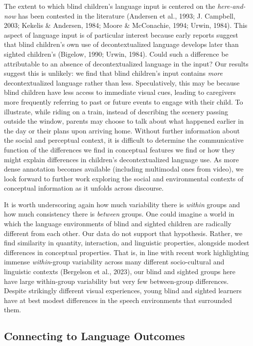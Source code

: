 \documentclass[
  man]{apa6}
\begin{document}
The extent to which blind children's language input is centered on the \emph{here-and-now} has been contested in the literature (Andersen et al., 1993; J. Campbell, 2003; Kekelis \& Andersen, 1984; Moore \& McConachie, 1994; Urwin, 1984). This aspect of language input is of particular interest because early reports suggest that blind children's own use of decontextualized language develops later than sighted children's (Bigelow, 1990; Urwin, 1984). Could such a difference be attributable to an absence of decontextualized language in the input? Our results suggest this is unlikely: we find that blind children's input contains \emph{more} decontextualized language rather than less. Speculatively, this may be because blind children have less access to immediate visual cues, leading to caregivers more frequently referring to past or future events to engage with their child. To illustrate, while riding on a train, instead of describing the scenery passing outside the window, parents may choose to talk about what happened earlier in the day or their plans upon arriving home. Without further information about the social and perceptual context, it is difficult to determine the communicative function of the differences we find in conceptual features we find or how they might explain differences in children's decontextualized language use. As more dense annotation becomes available (including multimodal ones from video), we look forward to further work exploring the social and environmental contexts of conceptual information as it unfolds across discourse.

It is worth underscoring again how much variability there is \emph{within} groups and how much consistency there is \emph{between} groups. One could imagine a world in which the language environments of blind and sighted children are radically different from each other. Our data do not support that hypothesis. Rather, we find similarity in quantity, interaction, and linguistic properties, alongside modest differences in conceptual properties. That is, in line with recent work highlighting immense \emph{within}-group variability across many different socio-cultural and linguistic contexts (Bergelson et al., 2023), our blind and sighted groups here have large within-group variability but very few between-group differences. Despite strikingly different visual experiences, young blind and sighted learners have at best modest differences in the speech environments that surrounded them.

\hypertarget{connecting-to-language-outcomes}{%
\subsection{Connecting to Language Outcomes}\label{connecting-to-language-outcomes}}
\end{document}

